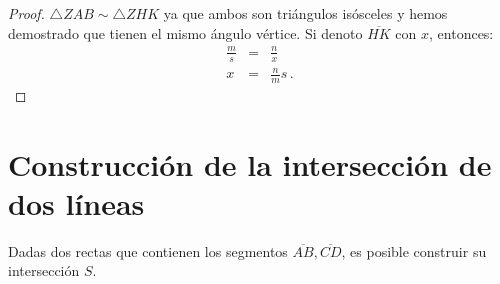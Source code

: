 \begin{proof}
$\triangle ZAB\sim\triangle ZHK$ ya que ambos son triángulos isósceles y hemos demostrado que tienen el mismo ángulo vértice. Si denoto $\overline{HK}$ con $x$, entonces:
\begin{eqnarray*}
\frac{m}{s} &=& \frac{n}{x}\\
x&=&\frac{n}{m}s\,.
\end{eqnarray*}
\end{proof}


\section{Construcción de la intersección de dos líneas}\label{s.two-lines}

\begin{theorem}
Dadas dos rectas que contienen los segmentos $\overline{AB}, \overline{CD}$, es posible construir su intersección $S$.
\end{theorem}


